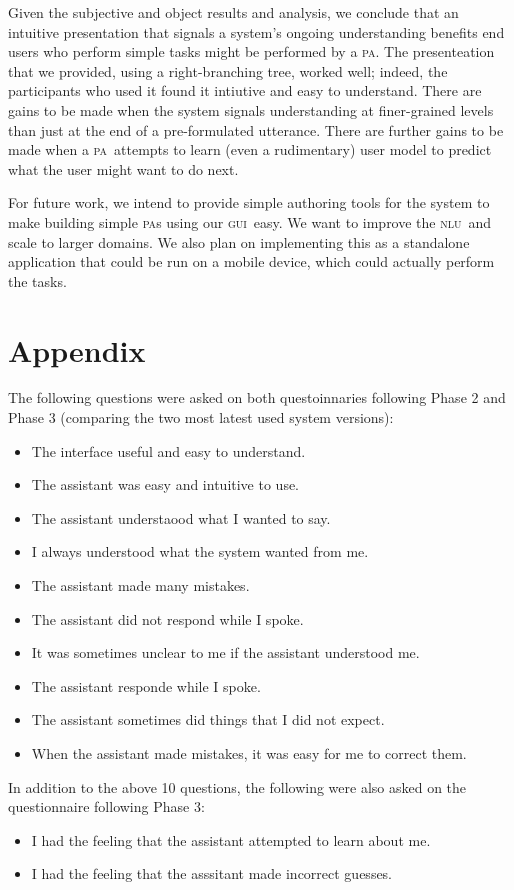 \documentclass[11pt]{article}
\newcommand{\nlu}[0]{\textsc{nlu}}
\newcommand{\ui}[0]{\textsc{gui}}
\newcommand{\pa}[0]{\textsc{pa}}
\begin{document}
Given the subjective and object results and analysis, we conclude that an intuitive presentation that signals a system's ongoing understanding benefits end users who perform simple tasks might be performed by a \pa. The presenteation that we provided, using a right-branching tree, worked well; indeed, the participants who used it found it intiutive and easy to understand. There are gains to be made when the system signals understanding at finer-grained levels than just at the end of a pre-formulated utterance. There are further gains to be made when a \pa\ attempts to learn (even a rudimentary) user model to predict what the user might want to do next. 

For future work, we intend to provide simple authoring tools for the system to make building simple \pa s using our \ui\ easy. We want to improve the \nlu\ and scale to larger domains. We also plan on implementing this as a standalone application that could be run on a mobile device, which could actually perform the tasks.


\section*{Appendix}

The following questions were asked on both questoinnaries following Phase 2 and Phase 3 (comparing the two most latest used system versions):
\begin{itemize}
 \item The interface useful and easy to understand.
 \item The assistant was easy and intuitive to use.
 \item The assistant understaood what I wanted to say.
 \item I always understood what the system wanted from me. 
 \item The assistant made many mistakes. 
 \item The assistant did not respond while I spoke.
 \item It was sometimes unclear to me if the assistant understood me. 
 \item The assistant responde while I spoke. 
 \item The assistant sometimes did things that I did not expect.
 \item When the assistant made mistakes, it was easy for me to correct them. 
\end{itemize}

In addition to the above 10 questions, the following were also asked on the questionnaire following Phase 3:
\begin{itemize}
 \item I had the feeling that the assistant attempted to learn about me.
 \item I had the feeling that the asssitant made incorrect guesses. 
\end{itemize}
\end{document}
